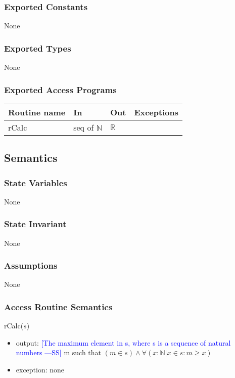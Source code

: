 \documentclass[12pt,fleqn]{examtst}
\newcommand{\authornote}[3]{\textcolor{#1}{[#3 ---#2]}}
\newcommand{\authornote}[3]{}
\newcommand{\wss}[1]{\authornote{blue}{SS}{#1}}
\begin{document}
\subsubsection* {Exported Constants}

None

\subsubsection* {Exported Types}

None 

\subsubsection* {Exported Access Programs}

\begin{tabular}{| l | l | l | p{5cm} |}
\hline
\textbf{Routine name} & \textbf{In} & \textbf{Out} & \textbf{Exceptions}\\
\hline
rCalc & seq of $\mathbb{N}$ & $\mathbb{R}$ & ~\\
\hline
\end{tabular}

\subsection* {Semantics}

\subsubsection* {State Variables}

None

\subsubsection* {State Invariant}

None

\subsubsection* {Assumptions}

None

\subsubsection* {Access Routine Semantics}

rCalc($s$)
\begin{itemize}
\item output: \wss{The maximum element in s, where s is a sequence of natural
    numbers} m such that $(m \in s) \wedge \forall (x: \mathbb{N} | x \in s: m \geq x)$
\item exception: none
\end{itemize}
\end{document}
